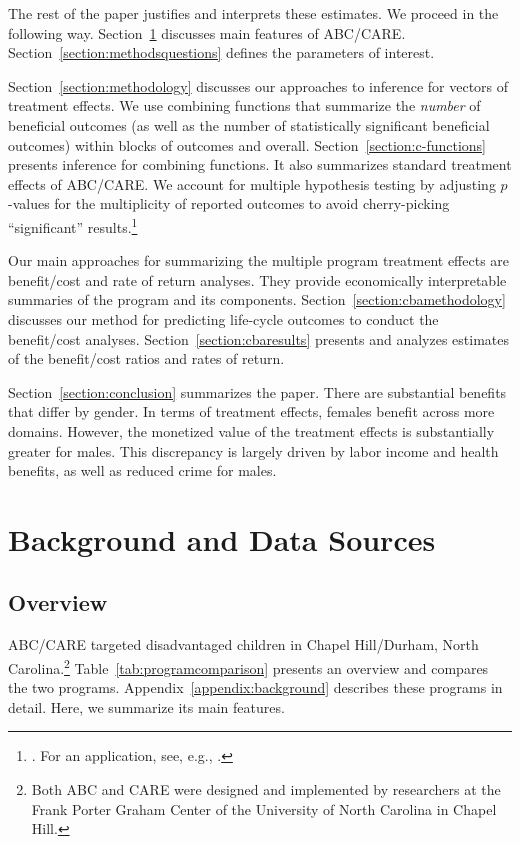 The rest of the paper justifies and interprets these estimates. We proceed in the following way. Section~\ref{section:background} discusses main features of ABC/CARE. Section~\ref{section:methodsquestions} defines the parameters of interest.

Section~\ref{section:methodology} discusses our approaches to inference for vectors of treatment effects. We use  combining functions that summarize the \emph{number} of beneficial outcomes (as well as the number of statistically significant beneficial outcomes) within blocks of outcomes and overall. Section~\ref{section:c-functions} presents inference for combining functions. It also summarizes standard treatment effects of ABC/CARE. We account for multiple hypothesis testing by adjusting $p$-values for the multiplicity of reported outcomes to avoid cherry-picking ``significant'' results.\footnote{\citet{Lehman_Romano_2005_AnnStat,Romano_Shaikh_2006_AnnStat}. For an application, see, e.g., \cite{Heckman_Moon_etal_2010_QE}.}

Our main approaches for summarizing the multiple program treatment effects are benefit/cost and rate of return analyses. They provide economically interpretable summaries of the program and its components. Section~\ref{section:cbamethodology} discusses our method for predicting life-cycle outcomes to conduct the benefit/cost analyses. Section~\ref{section:cbaresults} presents and analyzes estimates of the benefit/cost ratios and rates of return.

Section~\ref{section:conclusion} summarizes the paper. There are substantial benefits that differ by gender. In terms of treatment effects, females benefit across more domains. However, the monetized value of the treatment effects is substantially greater for males. This discrepancy is largely driven by labor income and health benefits, as well as reduced crime for males.

\section[Background and Data Sources]{Background and Data Sources} \label{section:background}

\subsection{Overview}

ABC/CARE targeted disadvantaged children in Chapel Hill/Durham, North Carolina.\footnote{Both ABC and CARE were designed and implemented by researchers at the Frank Porter Graham Center of the University of North Carolina in Chapel Hill.} Table~\ref{tab:programcomparison} presents an overview and compares the two programs. Appendix~\ref{appendix:background} describes these programs in detail. Here, we summarize its main features.

